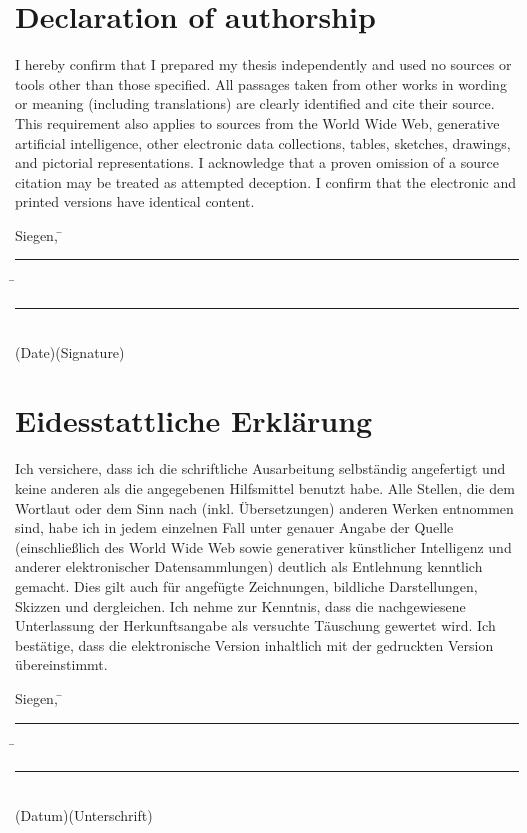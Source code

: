 
\ifenglish
	\chapter*{Declaration of authorship}
	\thispagestyle{empty}

	I hereby confirm that I prepared my thesis independently and used no sources or tools other than those specified. All passages taken from other works in wording or meaning (including translations) are clearly identified and cite their source. This requirement also applies to sources from the World Wide Web, generative artificial intelligence, other electronic data collections, tables, sketches, drawings, and pictorial representations. I acknowledge that a proven omission of a source citation may be treated as attempted deception. I confirm that the electronic and printed versions have identical content.\\[8ex]

	\begin{tabbing}
		Siegen, \hspace{0.4cm} \= \rule[-0.15\baselineskip]{5cm}{.4pt}  \hspace{0.7cm}\= \rule[-0.15\baselineskip]{6cm}{.4pt}\\
		\renewcommand{\baselinestretch}{0.5}\normalsize
		\>\small{(Date)}\>\small{(Signature)}
	\end{tabbing}
	\renewcommand{\baselinestretch}{1}\normalsize
\fi

\ifdeutsch
	\chapter*{Eidesstattliche Erklärung}
	\thispagestyle{empty}

	Ich versichere, dass ich die schriftliche Ausarbeitung selbständig angefertigt und keine anderen als die angegebenen Hilfsmittel benutzt habe. Alle Stellen, die dem Wortlaut oder dem Sinn nach (inkl. Übersetzungen) anderen Werken entnommen sind, habe ich in jedem einzelnen Fall unter genauer Angabe der Quelle (einschließlich des World Wide Web sowie generativer künstlicher Intelligenz und anderer elektronischer Datensammlungen) deutlich als Entlehnung kenntlich gemacht. Dies gilt auch für angefügte Zeichnungen, bildliche Darstellungen, Skizzen und dergleichen. Ich nehme zur Kenntnis, dass die nachgewiesene Unterlassung der Herkunftsangabe als versuchte Täuschung gewertet wird. Ich bestätige, dass die elektronische Version inhaltlich mit der gedruckten Version
	übereinstimmt.
	\\[8ex]
	\begin{tabbing}
		Siegen, \hspace{0.4cm} \= \rule[-0.15\baselineskip]{5cm}{.4pt}  \hspace{0.7cm}\= \rule[-0.15\baselineskip]{6cm}{.4pt}\\
		\renewcommand{\baselinestretch}{0.5}\normalsize
		\>\small{(Datum)}\>\small{(Unterschrift)}
	\end{tabbing}
	\renewcommand{\baselinestretch}{1}\normalsize
\fi

